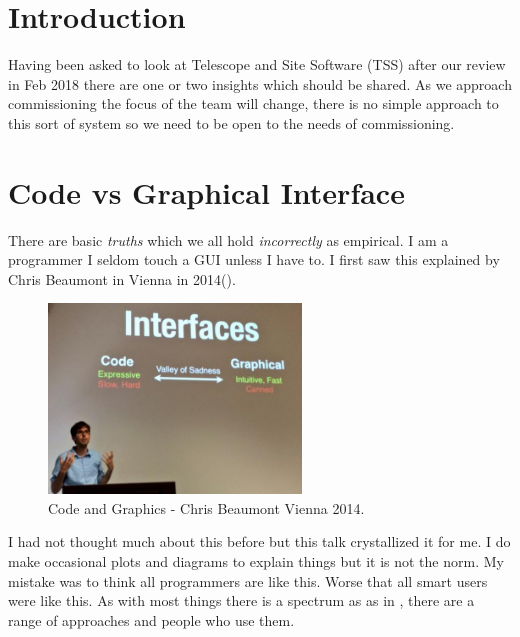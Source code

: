 \section{Introduction} \label{sec:intro}
Having  been asked to look at Telescope and Site Software (TSS) after our review in Feb 2018  there are  one or two insights which should be shared. As we approach commissioning the focus of the team will change, there is no simple approach to this sort of system so we need to be open to the needs of commissioning.


\section{Code vs  Graphical Interface }

There are basic {\em truths} which we all hold {\em incorrectly} as empirical. I am a programmer I seldom touch a GUI unless I have to. I first saw this explained by Chris Beaumont in Vienna in 2014().
\begin{figure}
\begin{center}
\includegraphics[width=0.6\textwidth]{beaumontCG}
\caption{Code and Graphics - Chris Beaumont Vienna 2014. \label{fig:gspec}}
\end{center}
\end{figure}

I had not thought much about this before but this talk crystallized it for me. I do make occasional plots and diagrams to explain things but it is not the norm. My mistake was to think all programmers are like this. Worse that all smart users were like this.
As with most things there is a spectrum as as in , there are a range of approaches and people who use them.

